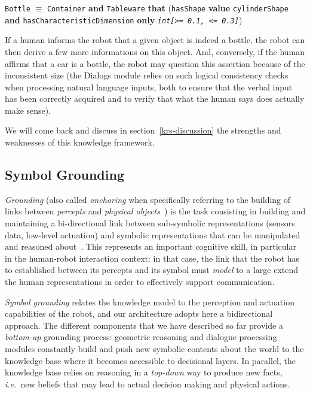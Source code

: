 \documentclass[preprint,3p,times]{elsarticle}
\newcommand{\concept}[1]{{\small \texttt{#1}}}
\newcommand{\ie}{{\textit{i.e.\ }}}
\begin{document}
\concept{Bottle} $\equiv$ \concept{Container} {\bf and} \concept{Tableware}
{\bf that} (\concept{hasShape} {\bf value} \concept{cylinderShape} {\bf and}
\concept{hasCharacteristicDimension} {\bf only} \concept{\em int[>= 0.1, <=
0.3]})

If a human informs the robot that a given object is indeed a bottle, the robot
can then derive a few more informations on this object. And, conversely, if the
human affirms that a car is a bottle, the robot may question this assertion
because of the inconsistent size (the {\sc Dialogs} module relies on such
logical consistency checks when processing natural language inputs, both to
ensure that the verbal input has been correctly acquired and to verify that what
the human says does actually make sense).

We will come back and discuss in section~\ref{krs-discussion} the strengths and
weaknesses of this knowledge framework.

\subsection{Symbol Grounding}

\emph{Grounding} (also called \emph{anchoring} when specifically referring to
the building of links between \emph{percepts} and \emph{physical
objects}~\cite{Coradeschi2003}) is the task consisting in building and
maintaining a bi-directional link between sub-symbolic representations (sensors
data, low-level actuation) and symbolic representations that can be manipulated
and reasoned about~\cite{Harnad1990}. This represents an important cognitive
skill, in particular in the human-robot interaction context: in that case, the
link that the robot has to established between its percepts and its symbol must
\emph{model} to a large extend the human representations in order to effectively
support communication.

\emph{Symbol grounding} relates the knowledge model to the perception and
actuation capabilities of the robot, and our architecture adopts here a
bidirectional approach.  The different components that we have described so far
provide a \textit{bottom-up} grounding process: geometric reasoning and dialogue
processing modules constantly build and push new symbolic contents about the
world to the knowledge base where it becomes accessible to decisional layers. In
parallel, the knowledge base relies on reasoning in a \textit{top-down} way to
produce new facts, \ie new beliefs that may lead to actual decision making and
physical actions.
\end{document}
